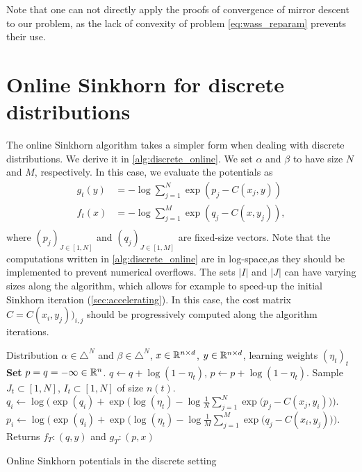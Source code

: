 Note that one can not directly apply the proofs of convergence of mirror descent to our problem, as the lack of convexity of problem \eqref{eq:wass_reparam} prevents their use.


\section{Online Sinkhorn for discrete distributions}\label{sec:sinkhorn_discrete}

The online Sinkhorn algorithm takes a simpler form when dealing with discrete
distributions. We derive it in \autoref{alg:discrete_online}. We set $\alpha$
and $\beta$ to have size $N$ and $M$, respectively. In this case, we evaluate
the potentials as
\begin{align}
    g_t(y) &= - \log \sum_{j=1}^N \exp(p_j - C(x_j, y)) \\
    f_t(x) &= - \log \sum_{j=1}^M \exp(q_j - C(x, y_j)), \\
\end{align}
where $(p_j)_{J \in [1, N]}$ and $(q_j)_{J \in [1, M]}$ are fixed-size vectors.
Note that the computations written in \autoref{alg:discrete_online} are
in log-space,as they should be implemented to prevent numerical overflows. The sets $|I|$ and $|J|$ can
have varying sizes along the algorithm, which allows for example to speed-up the
initial Sinkhorn iteration (\autoref{sec:accelerating}). In this case, the
cost matrix $\hat C = C(x_i,y_j))_{i,j}$ should be progressively computed along the algorithm iterations.

\begin{algorithm}[t]
    \begin{algorithmic}
    \Input Distribution $\alpha \in \triangle^N$ and 
    $\beta \in \triangle^N$, $x \in \mathbb{R}^{n \times d}$, 
    $y \in \mathbb{R}^{n \times d}$, learning weights ${(\eta_t)}_t$
    \State \textbf{Set} $p = q = - \infty \in \mathbb{R}^n$.
        \State $q \gets q + \log(1 - \eta_t)$, $p \gets p + \log(1 - \eta_t)$.
        \State Sample $J_t \subset [1, N]$, $I_t \subset [1, N]$ of size $n(t)$.
            \State $q_i \gets \log \Big( \exp(q_i)
            + \exp\big(\log(\eta_t) - \log \frac{1}{N} 
            \sum_{j=1}^{N} \exp(p_j - C(x_j, y_i)\big) \Big) $.
        \EndFor
        \State $p_i \gets \log \Big( \exp(q_i)
        + \exp \big( \log(\eta_t) - \log \frac{1}{M} 
        \sum_{j=1}^{M} \exp(q_j - C(x_i, y_j)\big) \Big)$.
        \EndFor
    \EndFor
    \State Returns $f_T : (q, y)$ and
    $g_T : (p, x)$
    \end{algorithmic}
    \caption{Online Sinkhorn potentials in the discrete setting}\label{alg:discrete_online}
\end{algorithm}



